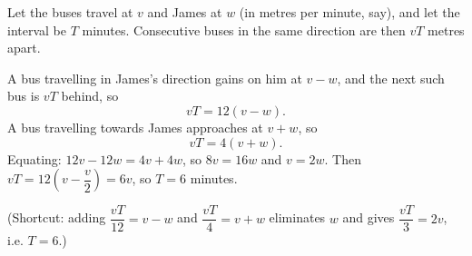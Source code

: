 Let the buses travel at $v$ and James at $w$ (in metres per minute, say), and let the interval be $T$ minutes. Consecutive buses in the same direction are then $vT$ metres apart.

A bus travelling in James's direction gains on him at $v-w$, and the next such bus is $vT$ behind, so
\[vT=12(v-w).\]
A bus travelling towards James approaches at $v+w$, so
\[vT=4(v+w).\]
Equating: $12v-12w=4v+4w$, so $8v=16w$ and $v=2w$. Then $vT=12\left(v-\dfrac v2\right)=6v$, so $T=\boxed{6}$ minutes.

(Shortcut: adding $\dfrac{vT}{12}=v-w$ and $\dfrac{vT}{4}=v+w$ eliminates $w$ and gives $\dfrac{vT}{3}=2v$, i.e. $T=6$.)
